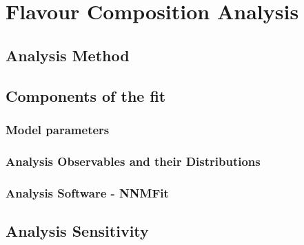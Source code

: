 \setchapterpreamble[u]{\margintoc}
\chapter{Flavour Composition Analysis}

\section{Analysis Method}
\label{sec:analysis}

\section{Components of the fit}
\label{sec:components}

\subsection{Model parameters}
\label{sec:params}

\subsection{Analysis Observables and their Distributions}
\label{sec:hists}

\subsection{Analysis Software - NNMFit}
\label{sec:nnmfit}

\section{Analysis Sensitivity}
\label{sec:sensitivty}

